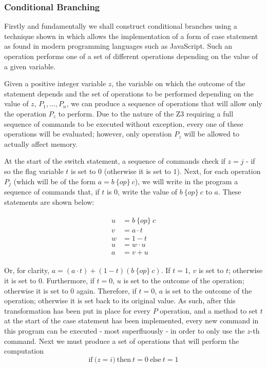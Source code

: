 \documentclass[Master.tex]{subfiles}
\begin{document}
\subsubsection{Conditional Branching}

Firstly and fundamentally we shall construct conditional branches using a technique shown in \cite{ibarra1983control} which allows the implementation of a form of case statement as found in modern programming languages such as JavaScript. Such an operation performs one of a set of different operations depending on the value of a given variable.

Given a positive integer variable $z$, the variable on which the outcome of the statement depends and the set of operations to be performed depending on the value of $z$, $P_1, ... , P_n$, we can produce a sequence of operations that will allow only the operation $P_z$ to perform. Due to the nature of the Z3 requiring a full sequence of commands to be executed without exception, every one of these operations will be evaluated; however, only operation $P_z$ will be allowed to actually affect memory.


At the start of the switch statement, a sequence of commands check if $z = j$ - if so the flag variable $t$ is set to $0$ (otherwise it is set to $1$). Next, for each operation $P_j$ (which will be of the form $a = b\ \{op\}\ c$), we will write in the program a sequence of commands that, if $t$ is $0$, write the value of $b\ \{op\}\ c$ to $a$. These statements are shown below:

\begin{gather*}
\begin{aligned}
u &= b\ \{op\}\ c \\
v &= a \cdot t \\
w &= 1 - t \\
u &= w \cdot u \\
a &= v + u
\end{aligned}
\end{gather*}

Or, for clarity, $a = (a \cdot t) + (1 - t)(b\ \{op\}\ c)$. If $t = 1$, $v$ is set to $t$; otherwise it is set to $0$. Furthermore, if $t = 0$, $u$ is set to the outcome of the operation; otherwise it is set to $0$ again. Therefore, if $t = 0$, $a$ is set to the outcome of the operation; otherwise it is set back to its original value. As such, after this transformation has been put in place for every $P$ operation, and a method to set $t$ at the start of the case statement has been implemented, every new command in this program can be executed - most superfluously - in order to only use the $z$-th command. Next we must produce a set of operations that will perform the computation
\begin{equation*}
\mathrm{if\ (}z = i\mathrm{)\ then\ } t = 0 \mathrm{\ else\ } t = 1
\end{equation*}
\end{document}
